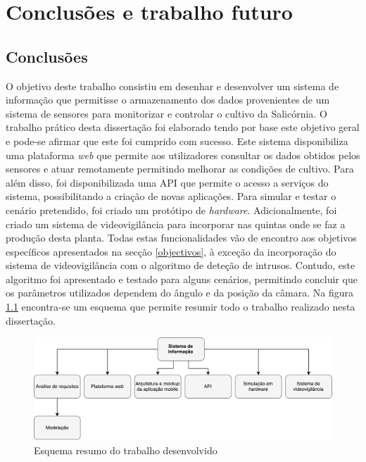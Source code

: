\chapter{Conclusões e trabalho futuro}


\section{Conclusões}



O objetivo deste trabalho consistiu em desenhar e desenvolver um sistema de informação que permitisse o armazenamento dos dados provenientes de um sistema de sensores para monitorizar e controlar o cultivo da Salicórnia. O trabalho prático desta dissertação foi elaborado tendo por base este objetivo geral e pode-se afirmar que este foi cumprido com sucesso. Este sistema disponibiliza uma plataforma \textit{web} que permite aos utilizadores consultar os dados obtidos pelos sensores e atuar remotamente permitindo melhorar as condições de cultivo. Para além disso, foi disponibilizada uma \ac{API} que permite o acesso a serviços do sistema, possibilitando a criação de novas aplicações. Para simular e testar o cenário pretendido, foi criado um protótipo de \textit{hardware}. Adicionalmente, foi criado um sistema de videovigilância para incorporar nas quintas onde se faz a produção desta planta. Todas estas funcionalidades vão de encontro aos objetivos específicos apresentados na secção \ref{objectivos}, à exceção da incorporação do sistema de videovigilância com o algoritmo de deteção de intrusos. Contudo, este algoritmo foi apresentado e testado para alguns cenários, permitindo concluir que os parâmetros utilizados dependem do ângulo e da posição da câmara.  Na figura \ref{resumo} encontra-se um esquema que permite resumir todo o trabalho realizado nesta dissertação. 

\begin{figure}[h]
	\centering
	\includegraphics[width=0.68\linewidth]{esquemas/conclusaofinal.pdf}
	\caption{Esquema resumo do trabalho desenvolvido}
	\label{resumo}
\end{figure}




